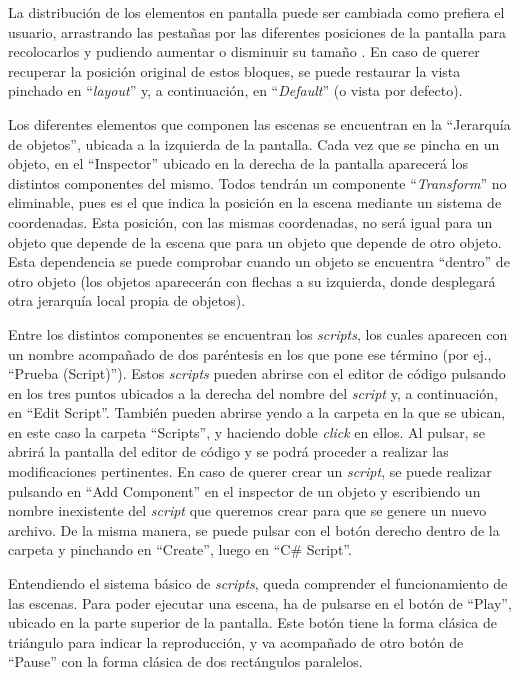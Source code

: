 La distribución de los elementos en pantalla puede ser cambiada como prefiera el usuario, arrastrando las pestañas por las diferentes posiciones de la pantalla para recolocarlos y pudiendo aumentar o disminuir su tamaño . En caso de querer recuperar la posición original de estos bloques, se puede restaurar la vista pinchado en ``\textit{layout}'' y, a continuación, en ``\textit{Default}'' (o vista por defecto).

Los diferentes elementos que componen las escenas se encuentran en la ``Jerarquía de objetos'', ubicada a la izquierda de la pantalla. Cada vez que se pincha en un objeto, en el ``Inspector'' ubicado en la derecha de la pantalla aparecerá los distintos componentes del mismo. Todos tendrán un componente ``\textit{Transform}'' no eliminable, pues es el que indica la posición en la escena mediante un sistema de coordenadas. Esta posición, con las mismas coordenadas, no será igual para un objeto que depende de la escena que para un objeto que depende de otro objeto. Esta dependencia se puede comprobar cuando un objeto se encuentra ``dentro'' de otro objeto (los objetos aparecerán con flechas a su izquierda, donde desplegará otra jerarquía local propia de objetos).

Entre los distintos componentes se encuentran los \textit{scripts}, los cuales aparecen con un nombre acompañado de dos paréntesis en los que pone ese término (por ej., ``Prueba (Script)''). Estos \textit{scripts} pueden abrirse con el editor de código pulsando en los tres puntos ubicados a la derecha del nombre del \textit{script} y, a continuación, en ``Edit Script''. También pueden abrirse yendo a la carpeta en la que se ubican, en este caso la carpeta ``Scripts'', y haciendo doble \textit{click} en ellos. Al pulsar, se abrirá la pantalla del editor de código y se podrá proceder a realizar las modificaciones pertinentes. En caso de querer crear un \textit{script}, se puede realizar pulsando en ``Add Component'' en el inspector de un objeto y escribiendo un nombre inexistente del \textit{script} que queremos crear para que se genere un nuevo archivo. De la misma manera, se puede pulsar con el botón derecho dentro de la carpeta y pinchando en ``Create'', luego en ``C\# Script''.

Entendiendo el sistema básico de \textit{scripts}, queda comprender el funcionamiento de las escenas. Para poder ejecutar una escena, ha de pulsarse en el botón de ``Play'', ubicado en la parte superior de la pantalla. Este botón tiene la forma clásica de triángulo para indicar la reproducción, y va acompañado de otro botón de ``Pause'' con la forma clásica de dos rectángulos paralelos. 

